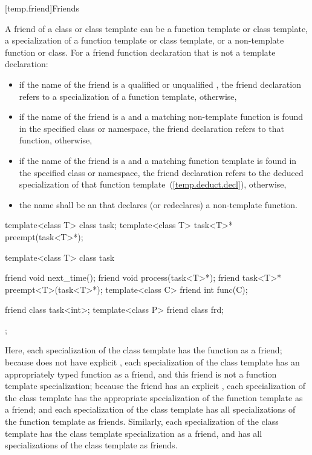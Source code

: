 [temp.friend]{Friends}

\pnum
{}%
A friend of a class or class template can be a function template or
class template, a specialization of a function template or class
template, or a non-template function or class.
For a friend function declaration that is not a template declaration:

\begin{itemize}
\item
if the name of the friend is a qualified or unqualified ,
the friend declaration refers to a specialization of a function
template, otherwise,
\item
if the name of the friend is a  and a matching non-template
function is found in the specified class or namespace, the friend
declaration refers to that function, otherwise,
\item
if the name of the friend is a  and a matching
function template
is found in the specified class
or namespace, the friend declaration refers to
the deduced specialization of that function template~(\ref{temp.deduct.decl}), otherwise,
\item
the name shall be an  that declares (or redeclares) a
non-template function.
\end{itemize}

\enterexample
\begin{codeblock}
template<class T> class task;
template<class T> task<T>* preempt(task<T>*);

template<class T> class task {
  friend void next_time();
  friend void process(task<T>*);
  friend task<T>* preempt<T>(task<T>*);
  template<class C> friend int func(C);

  friend class task<int>;
  template<class P> friend class frd;
};
\end{codeblock}

Here,
each specialization of the
class template has the function
as a friend;
because
does not have explicit
,
each specialization of the
class template has an appropriately typed function
as a friend, and this friend is not a function template specialization;
because the friend
has an explicit
,
each specialization of the
class template has the appropriate specialization of the function
template
as a friend;
and each specialization of the
class template has all specializations of the function template
as friends.
Similarly,
each specialization of the
class template has the class template specialization
as a friend, and has all specializations of the class template
as friends.
\exitexample

